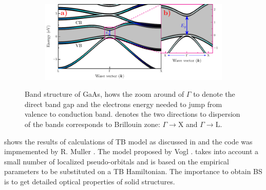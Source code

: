 \begin{figure}[h!]\label{fig:subsubsection-1.1.1-GaAsbands-1}
	\centering
	\begin{subfigure}{\textwidth}
	\includegraphics[width=\linewidth]{../figures/chapter-1/bands/build/bands01}
	\label{subfig:subsubsection-1.1.1-GaAsbands-1-a)}
	\label{subfig:subsubsection-1.1.1-GaAsbands-1-b)}
\end{subfigure}
	\caption{Band structure of GaAs,  hows the zoom around of $\Gamma$  to denote the direct band gap and the electrons energy  needed to jump from valence to conduction band.  denotes the two directions to dispersion of the bands corresponds to Brillouin zone: $\Gamma\to\mathrm{X}$ and  $\Gamma\to\mathrm{L}$.\cite{fox2002optical}}
\end{figure}

 shows the results of calculations of TB model as discussed in \cite{vogl1983asemiempirical} and the code was impmemented by R. Muller \cite{rpmuller2017}. The model proposed by Vogl .  takes into account a small number of localized pseudo-orbitals and is based on the empirical parameters to be  substituted on a TB Hamiltonian.  The importance to obtain BS is to  get detailed optical properties of solid structures.

